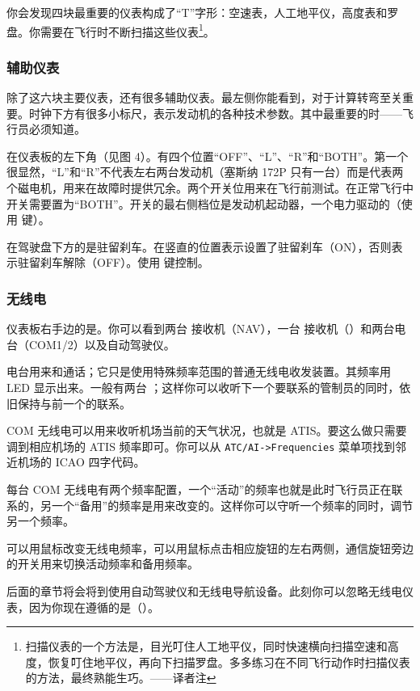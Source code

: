 你会发现四块最重要的仪表构成了“T”字形：空速表，人工地平仪，高度表和罗盘。你需要在飞行时不断扫描这些仪表\footnote{扫描仪表的一个方法是，目光叮住人工地平仪，同时快速横向扫描空速和高度，恢复叮住地平仪，再向下扫描罗盘。多多练习在不同飞行动作时扫描仪表的方法，最终熟能生巧。——译者注}。

\subsubsection{辅助仪表}

除了这六块主要仪表，还有很多辅助仪表。最左侧你能看到，对于计算转弯至关重要。时钟下方有很多小标尺，表示发动机的各种技术参数。其中最重要的时——飞行员必须知道。

在仪表板的左下角（见图 4）。有四个位置“OFF”、“L”、“R”和“BOTH”。第一个很显然，“L”和“R”不代表左右两台发动机（塞斯纳 172P 只有一台）而是代表两个磁电机，用来在故障时提供冗余。两个开关位用来在飞行前测试。在正常飞行中开关需要置为“BOTH”。开关的最右侧档位是发动机起动器，一个电力驱动的（使用  键）。

在驾驶盘下方的是驻留刹车。在竖直的位置表示设置了驻留刹车（ON），否则表示驻留刹车解除（OFF）。使用  键控制。

\subsubsection{无线电}

仪表板右手边的是。你可以看到两台  接收机（NAV），一台  接收机（）和两台电台（COM1/2）以及自动驾驶仪。

电台用来和通话；它只是使用特殊频率范围的普通无线电收发装置。其频率用 LED 显示出来。一般有两台 ；这样你可以收听下一个要联系的管制员的同时，依旧保持与前一个的联系。

COM 无线电可以用来收听机场当前的天气状况，也就是 ATIS。要这么做只需要调到相应机场的 ATIS 频率即可。你可以从 \texttt{ATC/AI->Frequencies} 菜单项找到邻近机场的 ICAO 四字代码。

每台 COM 无线电有两个频率配置，一个“活动”的频率也就是此时飞行员正在联系的，另一个“备用”的频率是用来改变的。这样你可以守听一个频率的同时，调节另一个频率。

可以用鼠标改变无线电频率，可以用鼠标点击相应旋钮的左右两侧，通信旋钮旁边的开关用来切换活动频率和备用频率。

后面的章节将会将到使用自动驾驶仪和无线电导航设备。此刻你可以忽略无线电仪表，因为你现在遵循的是（）。

